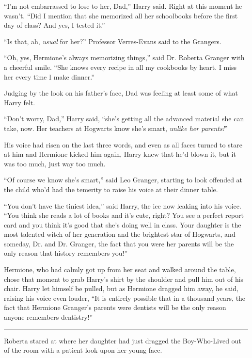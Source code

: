 ``I'm not embarrassed to lose to her, Dad,'' Harry said. Right at this moment he wasn't. ``Did I mention that she memorized all her schoolbooks before the first day of class? And yes, I tested it.''

``Is that, ah, \emph{usual} for her?'' Professor Verres-Evans said to the Grangers.

``Oh, yes, Hermione's always memorizing things,'' said Dr. Roberta Granger with a cheerful smile. ``She knows every recipe in all my cookbooks by heart. I miss her every time I make dinner.''

Judging by the look on his father's face, Dad was feeling at least some of what Harry felt.

``Don't worry, Dad,'' Harry said, ``she's getting all the advanced material she can take, now. Her teachers at Hogwarts know she's smart, \emph{unlike her parents!}''

His voice had risen on the last three words, and even as all faces turned to stare at him and Hermione kicked him again, Harry knew that he'd blown it, but it was too much, just way too much.

``Of course we know she's smart,'' said Leo Granger, starting to look offended at the child who'd had the temerity to raise his voice at their dinner table.

``You don't have the tiniest idea,'' said Harry, the ice now leaking into his voice. ``You think she reads a lot of books and it's cute, right? You see a perfect report card and you think it's good that she's doing well in class. Your daughter is the most talented witch of her generation and the brightest star of Hogwarts, and someday, Dr. and Dr. Granger, the fact that you were her parents will be the only reason that history remembers you!''

Hermione, who had calmly got up from her seat and walked around the table, chose that moment to grab Harry's shirt by the shoulder and pull him out of his chair. Harry let himself be pulled, but as Hermione dragged him away, he said, raising his voice even louder, ``It is entirely possible that in a thousand years, the fact that Hermione Granger's parents were dentists will be the only reason anyone remembers dentistry!''

\begin{center}\rule{3in}{0.4pt}\end{center}

Roberta stared at where her daughter had just dragged the Boy-Who-Lived out of the room with a patient look upon her young face.

